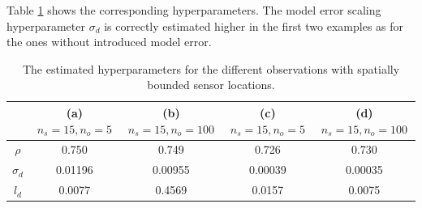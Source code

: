\documentclass[%
  a4paper,oneside,%
  11pt,%
  smallchapters,
  style=printdev,
  extramargin,
  green,%
  rgb, <cmyk>
  ]{tubsbook}
\begin{document}
Table \ref{tab:HyperPar1DSpatBound} shows the corresponding hyperparameters. The model error scaling hyperparameter $\sigma_d$ is correctly estimated higher in the first two examples as for the ones without introduced model error. 
\begin{table}[!ht]
\centering
\caption{The estimated hyperparameters for the different observations with spatially bounded sensor locations. }
\label{tab:HyperPar1DSpatBound}
\begin{tabular}{@{}ccccc@{}}
\toprule
           & (a) $n_s = 15, n_o = 5$ & (b) $n_s = 15, n_o = 100$ & (c) $n_s = 15, n_o = 5$ & (d) $n_s = 15, n_o = 100$ \\ \midrule
$\rho$     & 0.750             & 0.749              & 0.726               & 0.730                \\
$\sigma_d$ & 0.01196            & 0.00955            & 0.00039             & 0.00035               \\
$l_d$      & 0.0077              & 0.4569              & 0.0157               & 0.0075                 \\ \bottomrule
\end{tabular}
\end{table}


\FloatBarrier
\end{document}

